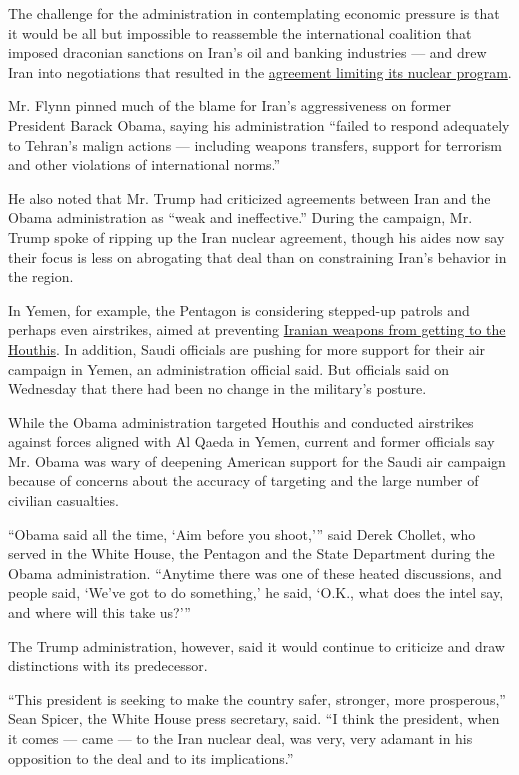 The challenge for the administration in contemplating economic pressure
is that it would be all but impossible to reassemble the international
coalition that imposed draconian sanctions on Iran's oil and banking
industries --- and drew Iran into negotiations that resulted in the
\href{https://www.nytimes.com/2015/07/15/world/middleeast/iran-nuclear-deal-is-reached-after-long-negotiations.html}{agreement
limiting its nuclear program}.

Mr. Flynn pinned much of the blame for Iran's aggressiveness on former
President Barack Obama, saying his administration ``failed to respond
adequately to Tehran's malign actions --- including weapons transfers,
support for terrorism and other violations of international norms.''

He also noted that Mr. Trump had criticized agreements between Iran and
the Obama administration as ``weak and ineffective.'' During the
campaign, Mr. Trump spoke of ripping up the Iran nuclear agreement,
though his aides now say their focus is less on abrogating that deal
than on constraining Iran's behavior in the region.

In Yemen, for example, the Pentagon is considering stepped-up patrols
and perhaps even airstrikes, aimed at preventing
\href{https://www.nytimes.com/2017/01/10/world/middleeast/yemen-iran-weapons-houthis.html}{Iranian
weapons from getting to the Houthis}. In addition, Saudi officials are
pushing for more support for their air campaign in Yemen, an
administration official said. But officials said on Wednesday that there
had been no change in the military's posture.

While the Obama administration targeted Houthis and conducted airstrikes
against forces aligned with Al Qaeda in Yemen, current and former
officials say Mr. Obama was wary of deepening American support for the
Saudi air campaign because of concerns about the accuracy of targeting
and the large number of civilian casualties.

``Obama said all the time, `Aim before you shoot,''' said Derek Chollet,
who served in the White House, the Pentagon and the State Department
during the Obama administration. ``Anytime there was one of these heated
discussions, and people said, `We've got to do something,' he said,
`O.K., what does the intel say, and where will this take us?'''

The Trump administration, however, said it would continue to criticize
and draw distinctions with its predecessor.

``This president is seeking to make the country safer, stronger, more
prosperous,'' Sean Spicer, the White House press secretary, said. ``I
think the president, when it comes --- came --- to the Iran nuclear
deal, was very, very adamant in his opposition to the deal and to its
implications.''

